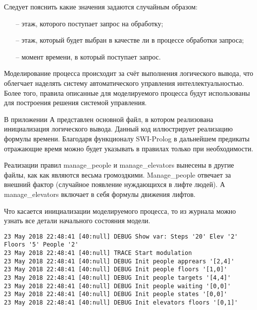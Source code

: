 		Следует пояснить какие значения задаются случайным образом:
		\begin{itemize}
			\item[--] этаж, которого поступает запрос на обработку;
			\item[--] этаж, который будет выбран в качестве ли в процессе обработки запроса;
			\item[--] момент времени, в который поступает запрос.
		\end{itemize}

		Моделирование процесса происходит за счёт выполнения логического вывода, что облегчает наделять 
			систему автоматического управления интеллектуальностью. Более того, правила описанные для
			моделируемого процесса будут использованы для построения решения системой управления.

		В приложении А представлен основной файл, в котором реализована инициализация логического вывода.
			Данный код иллюстрирует реализацию формулы времени. Благодаря функционалу SWI-Prolog
			в дальнейшем предикаты отражающие время можно будет указывать в правилах только при необходимости.
		
		Реализации правил manage\_people и manage\_elevators вынесены в другие файлы,
			как как являются весьма громоздкими.
			Manage\_people отвечает за внешний фактор (случайное появление нуждающихся в лифте людей).
			А manage\_elevators включает в себя формулы движения лифтов.

		Что касается инициализации моделируемого процесса, то из журнала можно узнать все детали начального
			состояния модели.

\begin{lstlisting}
23 May 2018 22:48:41 [40:null] DEBUG Show var: Steps '20' Elev '2' Floors '5' People '2'
23 May 2018 22:48:41 [40:null] TRACE Start modulation
23 May 2018 22:48:41 [40:null] DEBUG Init people apprears '[2,4]'
23 May 2018 22:48:41 [40:null] DEBUG Init people floors '[1,0]'
23 May 2018 22:48:41 [40:null] DEBUG Init people targets '[4,4]'
23 May 2018 22:48:41 [40:null] DEBUG Init people waiting '[0,0]'
23 May 2018 22:48:41 [40:null] DEBUG Init people states '[0,0]'
23 May 2018 22:48:41 [40:null] DEBUG Init elevators floors '[0,1]'
\end{lstlisting}

